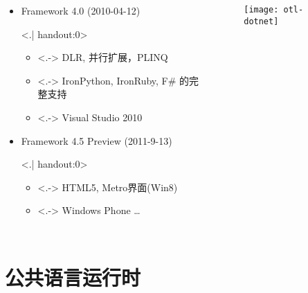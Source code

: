 \begin{frame}[t]
\begin{columns}[t]
\begin{itemize}[<+->]
\item Framework 4.0 (2010-04-12)

\only<.| handout:0>{
\begin{itemize}
\item<.-> DLR, 并行扩展，PLINQ
\item<.-> IronPython, IronRuby, F\# 的完整支持
\item<.-> Visual Studio 2010
\end{itemize}}

\item Framework 4.5 Preview (2011-9-13)

\only<.| handout:0>{
\begin{itemize}
\item<.-> HTML5, Metro界面(Win8)
\item<.-> Windows Phone \ldots
\end{itemize}}
\end{itemize}

\begin{figure}
\centerline{\texttt{[image: otl-dotnet]}}
\end{figure}
\end{columns}
\end{frame}


\section{公共语言运行时}

